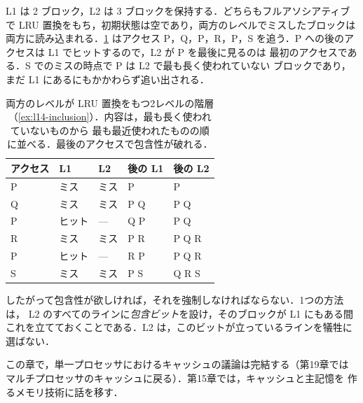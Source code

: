 \documentclass[../main.tex]{subfiles}
\begin{document}
\begin{example}
  \label{ex:l14-inclusion}
  L1 は 2 ブロック，L2 は 3 ブロックを保持する．どちらもフルアソシアティブで
  LRU 置換をもち，初期状態は空であり，両方のレベルでミスしたブロックは
  両方に読み込まれる．\cref{tab:l14-inclusion} はアクセス P，Q，P，R，P，S
  を追う．P への後のアクセスは L1 でヒットするので，L2 が P を最後に見るのは
  最初のアクセスである．S でのミスの時点で P は L2 で最も長く使われていない
  ブロックであり，まだ L1 にあるにもかかわらず追い出される．
\end{example}

\begin{table}[htbp]
  \centering\small
  \caption{両方のレベルが LRU 置換をもつ2レベルの階層
    （\cref{ex:l14-inclusion}）．内容は，最も長く使われていないものから
    最も最近使われたものの順に並べる．最後のアクセスで包含性が破れる．}
  \label{tab:l14-inclusion}
  \begin{tabular}{@{}lllll@{}}
    \toprule
    アクセス & L1   & L2   & 後の L1 & 後の L2 \\
    \midrule
    P      & ミス   & ミス & P        & P \\
    Q      & ミス   & ミス & P Q      & P Q \\
    P      & ヒット & ---  & Q P      & P Q \\
    R      & ミス   & ミス & P R      & P Q R \\
    P      & ヒット & ---  & R P      & P Q R \\
    S      & ミス   & ミス & P S      & Q R S \\
    \bottomrule
  \end{tabular}
\end{table}

したがって包含性が欲しければ，それを強制しなければならない．1つの方法は，
L2 のすべてのラインに\emph{包含ビット}を設け，そのブロックが L1 にもある間
これを立てておくことである．L2 は，このビットが立っているラインを犠牲に
選ばない．

この章で，単一プロセッサにおけるキャッシュの議論は完結する（第19章では
マルチプロセッサのキャッシュに戻る）．第15章では，キャッシュと主記憶を
作るメモリ技術に話を移す．
\end{document}
